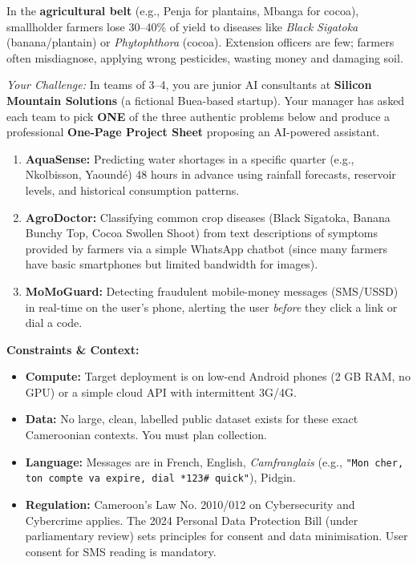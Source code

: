 \documentclass[11pt]{article}
\begin{document}
In the \textbf{agricultural belt} (e.g., Penja for plantains, Mbanga for cocoa), smallholder farmers lose 30--40\% of yield to diseases like \emph{Black Sigatoka} (banana/plantain) or \emph{Phytophthora} (cocoa). Extension officers are few; farmers often misdiagnose, applying wrong pesticides, wasting money and damaging soil.

\emph{Your Challenge:} In teams of 3--4, you are junior AI consultants at \textbf{Silicon Mountain Solutions} (a fictional Buea-based startup). Your manager has asked each team to pick \textbf{ONE} of the three authentic problems below and produce a professional \textbf{One-Page Project Sheet} proposing an AI-powered assistant.

\begin{enumerate}
    \item \textbf{AquaSense:} Predicting water shortages in a specific quarter (e.g., Nkolbisson, Yaoundé) 48 hours in advance using rainfall forecasts, reservoir levels, and historical consumption patterns.
    \item \textbf{AgroDoctor:} Classifying common crop diseases (Black Sigatoka, Banana Bunchy Top, Cocoa Swollen Shoot) from text descriptions of symptoms provided by farmers via a simple WhatsApp chatbot (since many farmers have basic smartphones but limited bandwidth for images).
    \item \textbf{MoMoGuard:} Detecting fraudulent mobile-money messages (SMS/USSD) in real-time on the user's phone, alerting the user \emph{before} they click a link or dial a code.
\end{enumerate}

\textbf{Constraints \& Context:}
\begin{itemize}
    \item \textbf{Compute:} Target deployment is on low-end Android phones (2 GB RAM, no GPU) or a simple cloud API with intermittent 3G/4G.
    \item \textbf{Data:} No large, clean, labelled public dataset exists for these exact Cameroonian contexts. You must plan collection.
    \item \textbf{Language:} Messages are in French, English, \emph{Camfranglais} (e.g., \texttt{"Mon cher, ton compte va expire, dial *123\# quick"}), Pidgin.
    \item \textbf{Regulation:} Cameroon's Law No. 2010/012 on Cybersecurity and Cybercrime applies. The 2024 Personal Data Protection Bill (under parliamentary review) sets principles for consent and data minimisation. User consent for SMS reading is mandatory.
\end{itemize}
\end{document}
